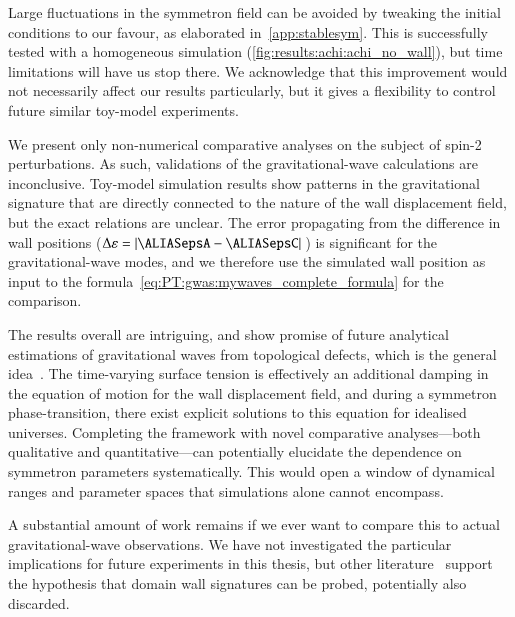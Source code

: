     Large fluctuations in the symmetron field can be avoided by tweaking the initial conditions to our favour, as elaborated in~\cref{app:stablesym}. This is successfully tested with a homogeneous simulation (\cref{fig:results:achi:achi_no_wall}), but time limitations will have us stop there. We acknowledge that this improvement would not necessarily affect our results particularly, but it gives a flexibility to control future similar toy-model experiments. 


    We present only non-numerical comparative analyses on the subject of spin-2 perturbations. 
    As such, validations of the gravitational-wave calculations are inconclusive. Toy-model simulation results show patterns in the gravitational signature that are directly connected to the nature of the wall displacement field, but the exact relations are unclear. %
    The error propagating from the difference in wall positions ($\Delta \varepsilon = \abs*{\epsA-\epsC}$) is significant for the gravitational-wave modes, and we therefore use the simulated wall position as input to the formula~\cref{eq:PT:gwas:mywaves_complete_formula} for the comparison.


    The results overall are intriguing, and show promise of future 
    {analytical estimations of gravitational waves from topological defects}, 
    which is the general idea~\citep{saikawaReviewGravitationalWaves2017}. %
    The time-varying surface tension is effectively an additional damping in the equation of motion for the wall displacement field, and during a symmetron phase-transition, there exist explicit solutions to this equation for idealised universes. Completing the framework with novel comparative analyses---both qualitative and quantitative---can potentially elucidate the dependence on symmetron parameters systematically. This would open a window of dynamical ranges and parameter spaces that simulations alone cannot encompass.



    A substantial amount of work remains if we ever want to compare this to actual gravitational-wave observations. We have not investigated the particular implications for future experiments in this thesis, but other literature~\citep{ferreiraGravitationalWavesDomain2023,clementsDetectingDarkDomain2023,paulGravitationalWaveSignatures2021,nakayamaGravitationalWavesDomain2017,hiramatsuEstimationGravitationalWave2014,hiramatsuGravitationalWavesCollapsing2010} support the hypothesis that domain wall signatures can be probed, potentially also discarded.%

